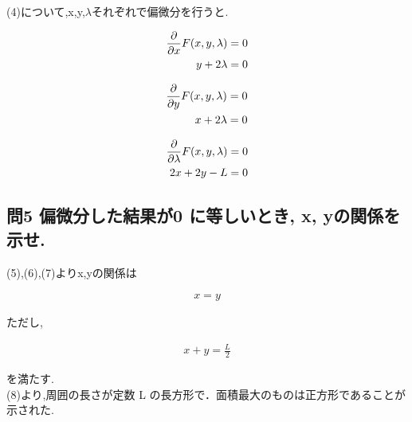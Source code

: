 \documentclass[dvipdfmx,autodetect-engine,titlepage]{jsarticle}
\begin{document}
(4)について,x,y,\begin{math}\lambda\end{math}それぞれで偏微分を行うと.

\begin{align}
  \frac{\partial}{\partial x}F(x,y,\lambda) &= 0\notag\\
  y + 2\lambda &= 0
\end{align}

\begin{align}
  \frac{\partial}{\partial y}F(x,y,\lambda) &= 0\notag\\
  x + 2\lambda &= 0
\end{align}

\begin{align}
  \frac{\partial}{\partial \lambda}F(x,y,\lambda) &= 0\notag\\
  2x + 2y - L &= 0
\end{align}


\subsection*{問5 偏微分した結果が0 に等しいとき, x, yの関係を示せ.}

(5),(6),(7)よりx,yの関係は

\begin{align}
  x = y
\end{align}

ただし,

\begin{align*}
  x + y = \frac{L}{2}
\end{align*}

を満たす.\\
(8)より,周囲の長さが定数 L の長方形で．面積最大のものは正方形であることが
示された.
\end{document}
